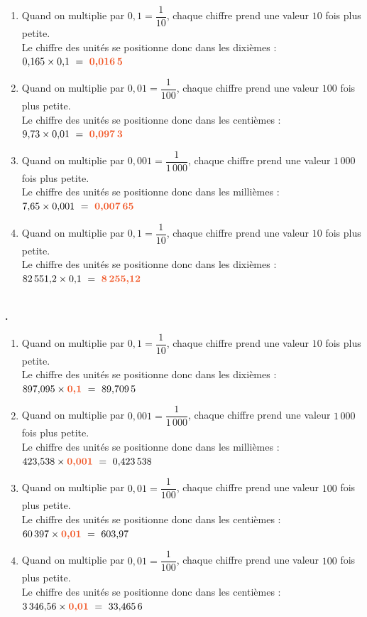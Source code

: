 \documentclass[10pt,a4paper]{article}
\newcounter{exo}
\newcommand{\exo}[1][]{%
  \refstepcounter{exo}%
  \textbf{\textcolor{Couleur8}{\\[0.3cm]\theexo.}}%
  \if\relax\detokenize{#1}\relax\else\ \textbf{#1}\fi\ %
}
\begin{document}
\begin{enumerate}[itemsep=1em]
	\item Quand on multiplie par $0{,}1=\dfrac{1}{10}$, chaque chiffre prend une valeur $10$ fois plus petite.\\Le chiffre des unités se positionne donc dans les dixièmes :\\$0{,}165 \times 0{,}1\,\,=\,\,{\color[HTML]{f15929}\boldsymbol{0{,}016\,5}}$
	\item Quand on multiplie par $0{,}01=\dfrac{1}{100}$, chaque chiffre prend une valeur $100$ fois plus petite.\\Le chiffre des unités se positionne donc dans les centièmes :\\$9{,}73 \times 0{,}01\,\,=\,\,{\color[HTML]{f15929}\boldsymbol{0{,}097\,3}}$
	\item Quand on multiplie par $0{,}001=\dfrac{1}{1\,000}$, chaque chiffre prend une valeur $1\,000$ fois plus petite.\\Le chiffre des unités se positionne donc dans les millièmes :\\$7{,}65 \times 0{,}001\,\,=\,\,{\color[HTML]{f15929}\boldsymbol{0{,}007\,65}}$
	\item Quand on multiplie par $0{,}1=\dfrac{1}{10}$, chaque chiffre prend une valeur $10$ fois plus petite.\\Le chiffre des unités se positionne donc dans les dixièmes :\\$82\,551{,}2 \times 0{,}1\,\,=\,\,{\color[HTML]{f15929}\boldsymbol{8\,255{,}12}}$
\end{enumerate}
 

\exo  

\begin{enumerate}[itemsep=1em]
	\item Quand on multiplie par $0{,}1=\dfrac{1}{10}$, chaque chiffre prend une valeur $10$ fois plus petite.\\Le chiffre des unités se positionne donc dans les dixièmes :\\$897{,}095 \times {\color[HTML]{f15929}\boldsymbol{0{,}1}}\,\,=\,\,89{,}709\,5$
	\item Quand on multiplie par $0{,}001=\dfrac{1}{1\,000}$, chaque chiffre prend une valeur $1\,000$ fois plus petite.\\Le chiffre des unités se positionne donc dans les millièmes :\\$423{,}538 \times {\color[HTML]{f15929}\boldsymbol{0{,}001}}\,\,=\,\,0{,}423\,538$
	\item Quand on multiplie par $0{,}01=\dfrac{1}{100}$, chaque chiffre prend une valeur $100$ fois plus petite.\\Le chiffre des unités se positionne donc dans les centièmes :\\$60\,397 \times {\color[HTML]{f15929}\boldsymbol{0{,}01}}\,\,=\,\,603{,}97$
	\item Quand on multiplie par $0{,}01=\dfrac{1}{100}$, chaque chiffre prend une valeur $100$ fois plus petite.\\Le chiffre des unités se positionne donc dans les centièmes :\\$3\,346{,}56 \times {\color[HTML]{f15929}\boldsymbol{0{,}01}}\,\,=\,\,33{,}465\,6$
\end{enumerate}
 
\end{document}
